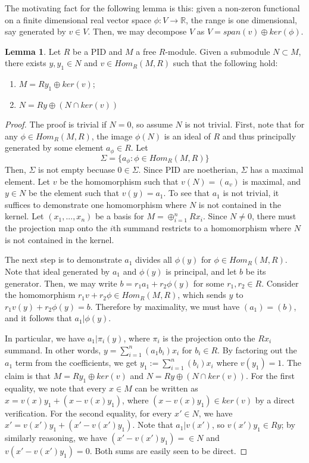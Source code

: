 \documentclass{article}
\theoremstyle{definition}
\theoremstyle{definition}
\theoremstyle{definition}
\theoremstyle{definition}
\newtheorem{lemma}[theorem]{Lemma}
\theoremstyle{definition}
\theoremstyle{definition}
\theoremstyle{definition}
\begin{document}
The motivating fact for the following lemma is this: given a non-zeron functional on a finite dimensional real vector space $\phi: V\to \mathbb{R}$, the range is one dimensional, say generated by $v\in V$. Then, we may decompose $V$ as $V=span(v)\oplus ker(\phi)$.
\begin{tcolorbox}
\begin{lemma}
Let $R$ be a PID and $M$ a free $R$-module. Given a submodule $N\subset M$, there exists $y,y_1\in N $ and $v\in Hom_R(M,R)$ such that the following hold:
\begin{enumerate}
    \item $M=Ry_1\oplus ker(v)$;
    \item $N=Ry\oplus (N\cap ker(v))$
\end{enumerate}
\end{lemma}
\end{tcolorbox}
\begin{proof}
    The proof is trivial if $N=0$, so assume $N$ is not trivial. First, note that for any $\phi\in Hom_R(M,R)$, the image $\phi(N)$ is an ideal of $R$ and thus principally generated by some element $a_{\phi}\in R$. Let \[\Sigma= \{ a_{\phi}:\phi\in Hom_R(M,R) \}\]
    Then, $\Sigma$ is not empty becuase $0\in \Sigma$. Since PID are noetherian, $\Sigma$ has a maximal element. Let $v$ be the homomorphism such that $v(N)=(a_v)$ is maximal, and $y\in N$ be the element such that $v(y)=a_1$. To see that $a_1$ is not trivial, it suffices to demonstrate one homomorphism where $N$ is not contained in the kernel. Let $(x_1,...,x_n)$ be a basis for $M=\oplus_{i=1}^n Rx_i$. Since $N\neq 0$, there must the projection map onto the $i$th summand restricts to a homomorphism where $N$ is not contained in the kernel. 
 
    The next step is to demonstrate $a_1$ divides all $\phi(y)$ for $\phi\in Hom_R(M,R)$. Note that ideal generated by $a_1$ and $\phi(y)$ is principal, and let $b$ be its generator. Then, we may write $b=r_1a_1+r_2\phi(y)$ for some $r_1,r_2\in R$. Consider the homomorphism $r_1v+r_2\phi\in Hom_R(M,R)$, which sends $y$ to $r_1v(y)+r_2\phi(y)=b$. Therefore by maximality, we must have $(a_1)=(b)$, and it follows that $a_1| \phi(y)$.
 
    In particular, we have $a_1|\pi_i(y)$, where $\pi_i$ is the projection onto the $Rx_i$ summand. In other words, $y=\sum_{i=1}^n(a_1b_i)x_i$ for $b_i\in R$. By factoring out the $a_1$ term from the coefficients, we get $y_1:=\sum_{i=1}^n(b_i)x_i$ where $v(y_1)=1$. The claim is that $M=Ry_1\oplus ker(v)$ and $N=Ry\oplus (N\cap ker(v))$. For the first equality, we note that every $x\in M$ can be written as $x=v(x)y_1+(x-v(x)y_1)$, where $(x-v(x)y_1)\in ker(v)$ by a direct verification. For the second equality, for every $x'\in N$, we have $x'=v(x')y_1+(x'-v(x')y_1)$. Note that $a_1|v(x')$, so $v(x')y_1\in Ry$; by similarly reasoning, we have $(x'-v(x')y_1)=\in N$ and $v(x'-v(x')y_1)=0$. Both sums are easily seen to be direct.
\end{proof}
\end{document}
